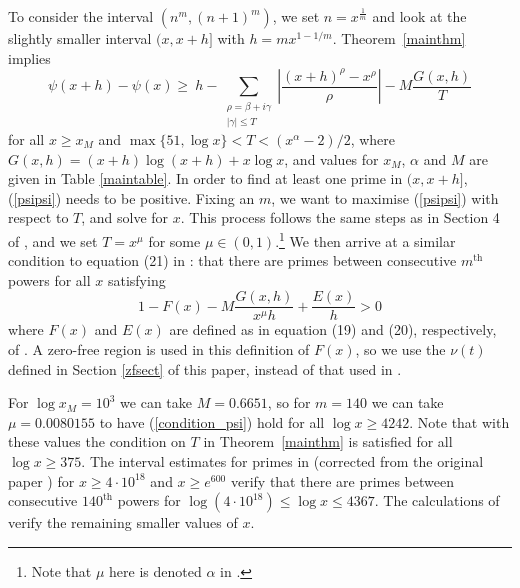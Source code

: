 \documentclass[reqno]{amsart}
\numberwithin{equation}{section}
\theoremstyle{remark}
\begin{document}
To consider the interval $(n^m, (n+1)^m)$, we set $n = x^\frac{1}{m}$ and look at the slightly smaller interval $(x,x+h]$ with $h=mx^{1-1/m}$. Theorem~\ref{mainthm} implies
\begin{equation} \label{psipsi} 
    \psi(x+h) - \psi(x) \geq \ h - \sum_{\substack{\rho=\beta+i\gamma\\|\gamma|\leq T}} \left|\frac{(x+h)^\rho-x^\rho}{\rho}\right| - M \frac{G(x,h)}{T}
\end{equation}
for all $x\geq x_M$ and $\max\{51,\log x\}<T<(x^{\alpha}-2)/2$, where $G(x,h) = (x+h)\log(x+h) + x\log x$, and values for $x_M$, $\alpha$ and $M$ are given in Table \ref{maintable}. In order to find at least one prime in $(x,x+h]$, (\ref{psipsi}) needs to be positive. Fixing an $m$, we want to maximise (\ref{psipsi}) with respect to $T$, and solve for $x$. This process follows the same steps as in Section 4 of \cite{cully2023primes}, and we set $T = x^\mu$ for some $\mu \in (0,1)$.\footnote{Note that $\mu$ here is denoted $\alpha$ in \cite{cully2023primes}.} We then arrive at a similar condition to equation (21) in \cite{cully2023primes}: that there are primes between consecutive $m^{\text{th}}$ powers for all $x$ satisfying
\begin{equation} \label{condition_psi} 
    1 - F(x) - M \frac{G(x,h)}{x^\mu h} + \frac{E(x)}{h} > 0
\end{equation}
where $F(x)$ and $E(x)$ are defined as in equation (19) and (20), respectively, of \cite{cully2023primes}. A zero-free region is used in this definition of $F(x)$, so we use the $\nu(t)$ defined in Section \ref{zfsect} of this paper, instead of that used in \cite{cully2023primes}.

For $\log x_M = 10^3$ we can take $M = 0.6651$, so for $m=140$ we can take $\mu = 0.0080155$ to have (\ref{condition_psi}) hold for all $\log x\geq 4242$. Note that with these values the condition on $T$ in Theorem~\ref{mainthm} is satisfied for all $\log x\geq 375$. The interval estimates for primes in \cite{CH_L_arX} (corrected from the original paper \cite{CH_L_21}) for $x\geq 4\cdot 10^{18}$ and $x\geq e^{600}$ verify that there are primes between consecutive $140^{\text{th}}$ powers for $\log(4\cdot 10^{18}) \leq \log x \leq 4367$. The calculations of \cite{O_H_P_14} verify the remaining smaller values of $x$.

\end{document}
